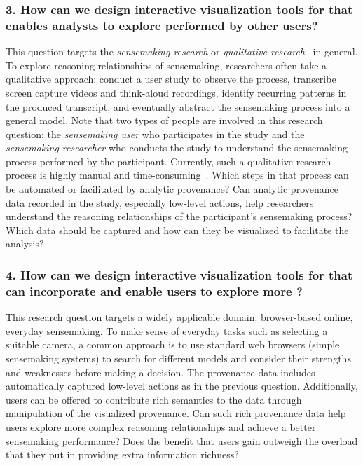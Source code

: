 \subsubsection*{3. How can we design interactive visualization tools for  that enables analysts to explore  performed by other users?}
This question targets the \emph{sensemaking research} or \emph{qualitative research}~\cite{Adams2008} in general. To explore reasoning relationships of sensemaking, researchers often take a qualitative approach: conduct a user study to observe the process, transcribe screen capture videos and think-aloud recordings, identify recurring patterns in the produced transcript, and eventually abstract the sensemaking process into a general model. Note that two types of people are involved in this research question: the \emph{sensemaking user} who participates in the study and the \emph{sensemaking researcher} who conducts the study to understand the sensemaking process performed by the participant. Currently, such a qualitative research process is highly manual and time-consuming~\cite{Wong2002}. Which steps in that process can be automated or facilitated by analytic provenance? Can analytic provenance data recorded in the study, especially low-level actions, help researchers understand the reasoning relationships of the participant's sensemaking process? Which data should be captured and how can they be visualized to facilitate the analysis?

\subsubsection*{4. How can we design interactive visualization tools for  that can incorporate  and enable users to explore more ?}

This research question targets a widely applicable domain: browser-based online, everyday sensemaking. To make sense of everyday tasks such as selecting a suitable camera, a common approach is to use standard web browsers (simple sensemaking systems) to search for different models and consider their strengths and weaknesses before making a decision. The provenance data includes automatically captured low-level actions as in the previous question. Additionally, users can be offered to contribute rich semantics to the data through manipulation of the visualized provenance. Can such rich provenance data help users explore more complex reasoning relationships and achieve a better sensemaking performance? Does the benefit that users gain outweigh the overload that they put in providing extra information richness?

